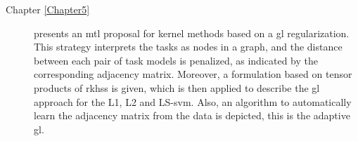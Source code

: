 \begin{description}

\item [{ Chapter \ref{Chapter5}}] presents an \acrshort{mtl} proposal for kernel methods based on a \acrfull{gl} regularization. This strategy interprets the tasks as nodes in a graph, and the distance between each pair of task models is penalized, as indicated by the corresponding adjacency matrix. Moreover, a formulation based on tensor products of \acrfull{rkhss} is given, which is then applied to describe the \acrshort{gl} approach for the L1, L2 and LS-\acrshort{svm}. Also, an algorithm to automatically learn the adjacency matrix from the data is depicted, this is the adaptive \acrshort{gl}. 



\end{description}
